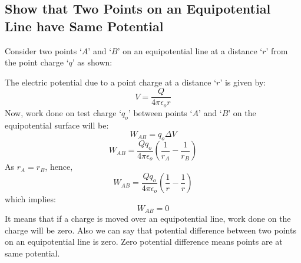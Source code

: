 \subsection*{Show that Two Points on an Equipotential Line have Same
Potential}
Consider two points `$A$' and `$B$' on an equipotential line at a
distance `$r$’ from the point charge `$q$' as shown:

The electric potential due to a
point charge at a distance `$r$' is given by:
\begin{equation}
  V = \frac{Q}{4\pi\epsilon_{o}r}  \nonumber
\end{equation}
Now, work done on test charge `$q_{o}$’ between points `$A$' and
`$B$' on the equipotential surface will be:
\begin{equation}\nonumber
  W_{AB} = q_{o}\Delta V
\end{equation}
\begin{equation}\nonumber
  W_{AB} = \frac{Qq_{o}}{4\pi\epsilon_{o} } (\frac{1}{r_{A}} - \frac{1}{r_{B}})
\end{equation}
As $r_{A} = r_{B}$, hence, 
\begin{equation}\nonumber
  W_{AB} = \frac{Qq_{o}}{4\pi\epsilon_{o} } (\frac{1}{r} - \frac{1}{r})
\end{equation}
which implies:
\begin{equation}\nonumber
  W_{AB} = 0
\end{equation}
It means that if a charge is moved over an equipotential line,
work done on the charge will be zero. Also we can say that potential difference
between two points on an equipotential line is zero. Zero potential difference
means points are at same potential.

